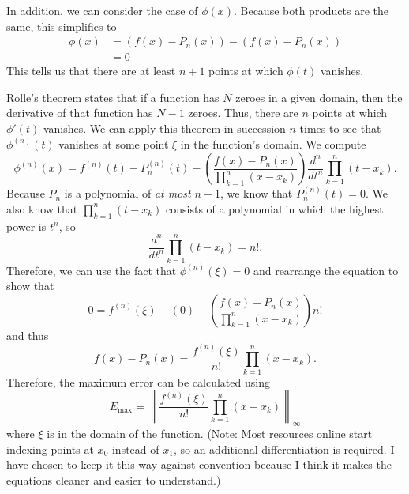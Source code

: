 \documentclass{article}
\begin{document}
In addition, we can consider the case of $\phi(x)$. Because both products are the same, this simplifies to
\begin{align*}
    \phi(x) & = (f(x)-P_n(x)) - (f(x)-P_n(x)) \\
            & = 0
\end{align*}
This tells us that there are at least $n+1$ points at which $\phi(t)$ vanishes.

Rolle's theorem states that if a function has $N$ zeroes in a given domain, then the derivative of that function has $N-1$ zeroes. Thus, there are $n$ points at which $\phi'(t)$ vanishes. We can apply this theorem in succession $n$ times to see that $\phi^{(n)}(t)$ vanishes at some point
$\xi$ in the function's domain. We compute
\begin{equation*}
    \phi^{(n)}(x) = f^{(n)}(t) - P_n^{(n)}(t) - \left(\frac{f(x)-P_n(x)}{\prod_{k=1}^n(x-x_k)}\right)\frac{d^n}{dt^n}\prod_{k=1}^n(t-x_k).
\end{equation*}
Because $P_n$ is a polynomial of \textit{at most} $n-1$, we know that $P_n^{(n)}(t)=0$. We also know that $\prod_{k=1}^n(t-x_k)$ consists of a polynomial in which the highest power is $t^n$, so
\[
    \frac{d^n}{dt^n}\prod_{k=1}^n(t-x_k)=n!.
\]
Therefore, we can use the fact that $\phi^{(n)}(\xi)=0$ and rearrange the equation to show that
\[
    0 = f^{(n)}(\xi) - (0) - \left(\frac{f(x)-P_n(x)}{\prod_{k=1}^n(x-x_k)}\right)n!
\]
and thus
\[
    f(x)-P_n(x) = \frac{f^{(n)}(\xi)}{n!}\prod_{k=1}^n(x-x_k).
\]
Therefore, the maximum error can be calculated using
\[
    E_{\max} = \left\lVert\frac{f^{(n)}(\xi)}{n!}\prod_{k=1}^n(x-x_k)\right\rVert_\infty
\]
where $\xi$ is in the domain of the function. (Note: Most resources online start indexing points at $x_0$ instead of $x_1$, so an additional differentiation is required. I have chosen to keep it this way against convention because I think it makes the equations cleaner and easier to understand.)
\end{document}
